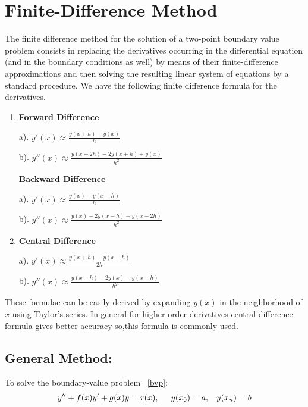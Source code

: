 \documentclass[aima203_lecturenotes_ku.tex]{subfiles}
\begin{document}
\section{Finite-Difference Method}
The finite difference method for the solution of a two-point boundary value problem consists in replacing the derivatives occurring in the differential equation (and in the boundary conditions as well) by means of their finite-difference approximations and then solving the resulting linear system of equations by a standard procedure. We have the following finite difference formula for the derivatives.
\begin{enumerate}
\item \textbf{Forward Difference}
  \begin{multicols}{2}
    a). $\displaystyle y'(x) \approx \frac{y(x+h) - y(x)}{h}$

    \columnbreak
    b). $\displaystyle y''(x) \approx \frac{y(x+2h) - 2y(x+h) +y(x)}{h^2}$
  \end{multicols}

  \textbf{Backward Difference}
  \begin{multicols}{2}
    a). $\displaystyle y'(x) \approx \frac{y(x) - y(x-h)}{h}$

    \columnbreak
    b). $\displaystyle y''(x) \approx \frac{y(x) -2y(x-h) + y(x-2h)}{h^2}$
  \end{multicols}

\item \textbf{Central Difference}
  \begin{multicols}{2}
    a). $\displaystyle y'(x) \approx \frac{y(x+h) - y(x-h)}{2h}$

    \columnbreak
    b). $\displaystyle y''(x) \approx \frac{y(x+h) - 2y(x)+ y(x-h)}{h^2}$
  \end{multicols}
\end{enumerate}
These formulae can be easily derived by expanding $y(x)$ in the neighborhood of $x$ using Taylor's series. In general for higher order derivatives central difference formula gives better accuracy so,this formula is commonly used.

\subsection{General Method:}
To solve the boundary-value problem ~\ref{bvp}:
\begin{equation}
  \label{bvp}
  y'' + f(x)y' + g(x)y = r(x), \hspace{5mm} y(x_0) = a, \hspace{3mm} y(x_{n}) = b
\end{equation}
\end{document}
